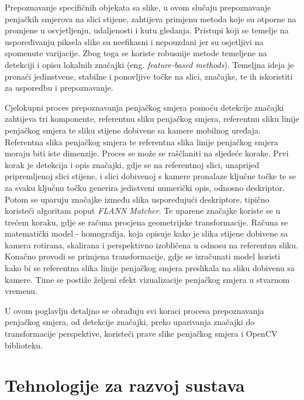 Prepoznavanje specifičnih objekata sa slike, u ovom slučaju prepoznavanje penjačkih smjerova na slici stijene, zahtijeva primjenu metoda koje su otporne na promjene u osvjetljenju, udaljenosti i kutu gledanja. Pristupi koji se temelje na uspoređivanju piksela slike su neefikasni i nepouzdani jer su osjetljivi na spomenute varijacije. Zbog toga se koriste robusnije metode temeljene na detekciji i opisu lokalnih značajki (eng. \textit{feature-based methods}). Temeljna ideja je pronaći jedinstvene, stabilne i ponovljive točke na slici, značajke, te ih iskoristiti za usporedbu i prepoznavanje.

Cjelokupni proces prepoznavanja penjačkog smjera pomoću detekcije značajki zahtijeva tri komponente, referentnu sliku penjačkog smjera, referentnu sliku linije penjačkog smjera te sliku stijene dobivene sa kamere mobilnog uređaja. Referentna slika penjačkog smjera te referentna slika linije penjačkog smjera moraju biti iste dimenzije. Proces se može se raščlaniti na sljedeće korake.
Prvi korak je detekcija i opis značajki, gdje se na referentnoj slici, unaprijed pripremljenoj slici stijene, i slici dobivenoj s kamere pronalaze ključne točke te se za svaku ključnu točku generira jedistveni numerički opis, odnosno deskriptor. Potom se uparuju značajke između slika uspoređujući deskriptore, tipično koristeći algoritam poput \textit{FLANN Matcher}. 
Te uparene značajke koriste se u trećem koraku, gdje se računa procjena geometrijske transformacije. Računa se matematički model - homografija, koja opisuje kako je slika stijene dobivene sa kamera rotirana, skalirana i perspektivno izobličena u odnosu na referentnu sliku. Konačno provodi se primjena transformacije, gdje se izračunati model koristi kako bi se referentna slika linije penjačkog smjera preslikala na sliku dobivenu sa kamere. Time se postiže željeni efekt vizualizacije penjačkog smjera u stvarnom vremenu.

U ovom poglavlju detaljno se obrađuju svi koraci procesa prepoznavanja penjačkog smjera, od detekcije značajki, preko uparivanja značajki do transformacije perspektive, koristeći prave slike penjačkog smjera i OpenCV biblioteku.





\section{Tehnologije za razvoj sustava}



 